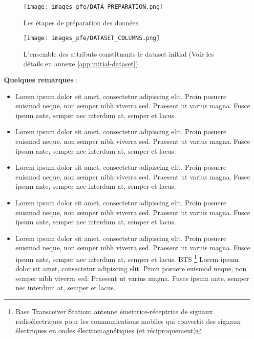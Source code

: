 \begin{figure}[hbt!]
  \centering
  \texttt{[image: images\_pfe/DATA\_PREPARATION.png]}
  \caption{Les étapes de préparation des données}
  \label{fig:data-preparation}
\end{figure}
\FloatBarrier

\begin{figure}[hbt!]
  \centering
  \texttt{[image: images\_pfe/DATASET\_COLUMNS.png]}
  \caption{L'ensemble des attributs constituants le dataset initial (Voir les détails en annexe \ref{app:initial-dataset}).}
  \label{fig:dataset-columns}
\end{figure}
\FloatBarrier

\textbf{Quelques remarques} :
\renewcommand{\labelitemi}{$\bullet$}
\begin{itemize}
  \item Lorem ipsum dolor sit amet, consectetur adipiscing elit. Proin posuere euismod neque, non semper nibh viverra sed. Praesent ut varius magna. Fusce ipsum ante, semper nec interdum at, semper et lacus.
  \item Lorem ipsum dolor sit amet, consectetur adipiscing elit. Proin posuere euismod neque, non semper nibh viverra sed. Praesent ut varius magna. Fusce ipsum ante, semper nec interdum at, semper et lacus.
  \item Lorem ipsum dolor sit amet, consectetur adipiscing elit. Proin posuere euismod neque, non semper nibh viverra sed. Praesent ut varius magna. Fusce ipsum ante, semper nec interdum at, semper et lacus.
  \item Lorem ipsum dolor sit amet, consectetur adipiscing elit. Proin posuere euismod neque, non semper nibh viverra sed. Praesent ut varius magna. Fusce ipsum ante, semper nec interdum at, semper et lacus.
  \item Lorem ipsum dolor sit amet, consectetur adipiscing elit. Proin posuere euismod neque, non semper nibh viverra sed. Praesent ut varius magna. Fusce ipsum ante, semper nec interdum at, semper et lacus. BTS \footnote{Base Transceiver Station: antenne émettrice-réceptrice de signaux radioélectriques pour les communications mobiles qui convertit des signaux électriques en ondes électromagnétiques (et réciproquement)} Lorem ipsum dolor sit amet, consectetur adipiscing elit. Proin posuere euismod neque, non semper nibh viverra sed. Praesent ut varius magna. Fusce ipsum ante, semper nec interdum at, semper et lacus.

\end{itemize}

